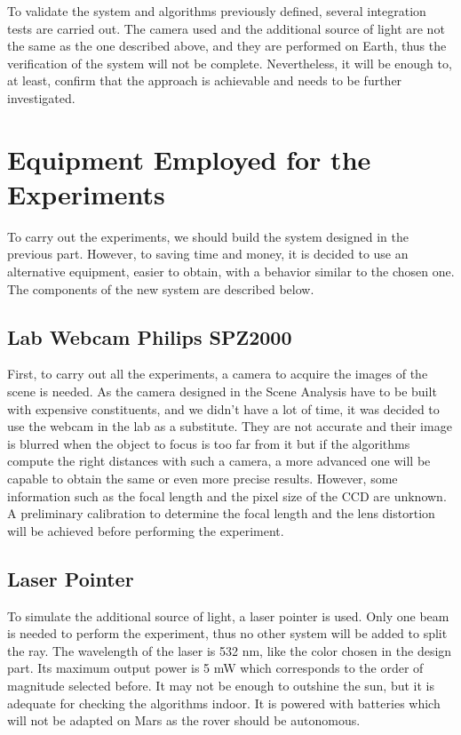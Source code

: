 To validate the system and algorithms previously defined, several integration tests are carried out. The camera used and the additional source of light are not the same as the one described above, and they are performed on Earth, thus the verification of the system will not be complete. Nevertheless, it will be enough to, at least, confirm that the approach is achievable and needs to be further investigated. 

\section{Equipment Employed for the Experiments}
To carry out the experiments, we should build the system designed in the previous part. However, to saving time and money, it is decided to use an alternative equipment, easier to obtain, with a behavior similar to the chosen one. The components of the new system are described below.

\subsection{Lab Webcam Philips SPZ2000}
First, to carry out all the experiments, a camera to acquire the images of the scene is needed. As the camera designed in the Scene Analysis have to be built with expensive constituents, and we didn't have a lot of time, it was decided to use the webcam in the lab as a substitute. They are not accurate and their image is blurred when the object to focus is too far from it but if the algorithms compute the right distances with such a camera, a more advanced one will be capable to obtain the same or even more precise results. However, some information such as the focal length and the pixel size of the CCD are unknown. A preliminary calibration to determine the focal length and the lens distortion will be achieved before performing the experiment.

\subsection{Laser Pointer}
To simulate the additional source of light, a laser pointer is used. Only one beam is needed to perform the experiment, thus no other system will be added to split the ray. The wavelength of the laser is 532 nm, like the color chosen in the design part. Its maximum output power is 5 mW which corresponds to the order of magnitude selected before. It may not be enough to outshine the sun, but it is adequate for checking the algorithms indoor. It is powered with batteries which will not be adapted on Mars as the rover should be autonomous. 

